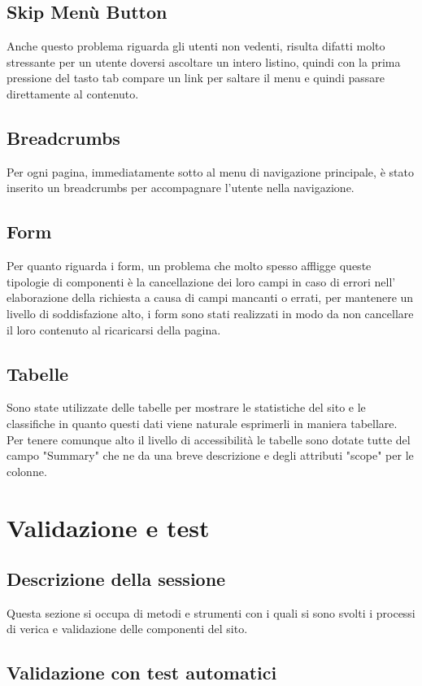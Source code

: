 \documentclass[openany, a4paper, 12pt]{report}
\begin{document}
		\section{Skip Menù Button}
		Anche questo problema riguarda gli utenti non vedenti, risulta difatti molto stressante per un utente doversi ascoltare un intero listino, quindi con la prima pressione del tasto tab compare un link per saltare il menu e quindi passare direttamente al contenuto.
		\section{Breadcrumbs}
		Per ogni pagina, immediatamente sotto al menu di navigazione principale, è stato inserito un breadcrumbs per accompagnare l'utente nella navigazione.
		\section{Form}
	Per quanto riguarda i form, un problema che molto spesso affligge queste tipologie di componenti è la cancellazione dei loro campi in caso di errori nell' elaborazione della richiesta a causa di campi mancanti o errati, per mantenere un livello di soddisfazione alto, i form sono stati realizzati in modo da non cancellare il loro contenuto al ricaricarsi della pagina.
		\section{Tabelle}
		Sono state utilizzate delle tabelle per mostrare le statistiche del sito e le classifiche in quanto questi dati viene naturale esprimerli in maniera tabellare. Per tenere comunque alto il livello di accessibilità le tabelle sono dotate tutte del campo "Summary" che ne da una breve descrizione e degli attributi "scope" per le colonne.


	\chapter{Validazione e test}
		\section{Descrizione della sessione}
			Questa sezione si occupa di metodi e strumenti con i quali si sono svolti i processi di verica e validazione delle componenti del sito.
		\section{Validazione con test automatici}
\end{document}
